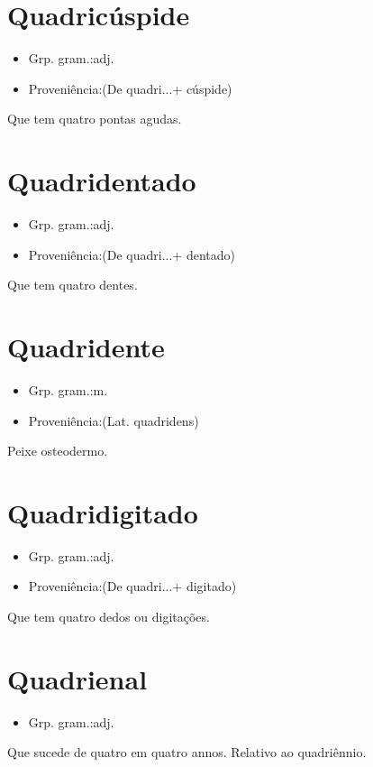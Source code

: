 \section{Quadricúspide}
\begin{itemize}
\item {Grp. gram.:adj.}
\end{itemize}
\begin{itemize}
\item {Proveniência:(De \textunderscore quadri...\textunderscore  + \textunderscore cúspide\textunderscore )}
\end{itemize}
Que tem quatro pontas agudas.
\section{Quadridentado}
\begin{itemize}
\item {Grp. gram.:adj.}
\end{itemize}
\begin{itemize}
\item {Proveniência:(De \textunderscore quadri...\textunderscore  + \textunderscore dentado\textunderscore )}
\end{itemize}
Que tem quatro dentes.
\section{Quadridente}
\begin{itemize}
\item {Grp. gram.:m.}
\end{itemize}
\begin{itemize}
\item {Proveniência:(Lat. \textunderscore quadridens\textunderscore )}
\end{itemize}
Peixe osteodermo.
\section{Quadridigitado}
\begin{itemize}
\item {Grp. gram.:adj.}
\end{itemize}
\begin{itemize}
\item {Proveniência:(De \textunderscore quadri...\textunderscore  + \textunderscore digitado\textunderscore )}
\end{itemize}
Que tem quatro dedos ou digitações.
\section{Quadrienal}
\begin{itemize}
\item {Grp. gram.:adj.}
\end{itemize}
Que sucede de quatro em quatro annos.
Relativo ao quadriênnio.
